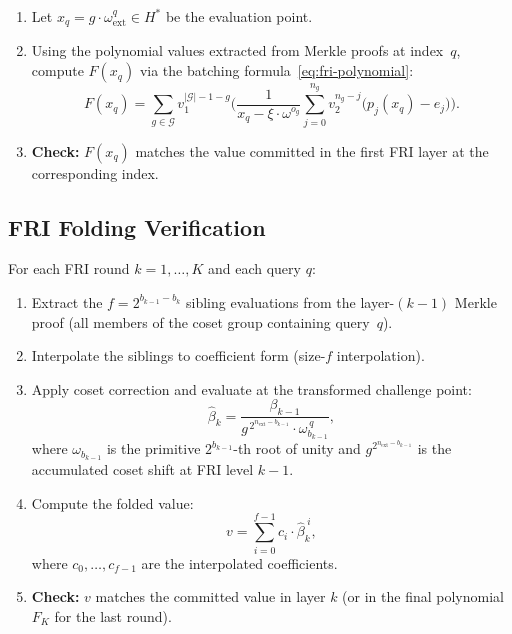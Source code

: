\begin{enumerate}[label=(\roman*)]
  \item Let $x_q = g \cdot \omega_{\mathrm{ext}}^q \in H^*$ be the evaluation point.

  \item Using the polynomial values extracted from Merkle proofs at index~$q$,
        compute $F(x_q)$ via the batching formula~\eqref{eq:fri-polynomial}:
        \[
          F(x_q) = \sum_{g \in \mathcal{G}} v_1^{|\mathcal{G}|-1-g}
                   \Biggl(
                     \frac{1}{x_q - \xi \cdot \omega^{o_g}}
                     \sum_{j=0}^{n_g} v_2^{n_g - j}
                     \bigl(p_j(x_q) - e_j\bigr)
                   \Biggr).
        \]

  \item \textbf{Check:} $F(x_q)$ matches the value committed in the first FRI layer
        at the corresponding index.
\end{enumerate}

\subsection{FRI Folding Verification}
\label{sec:fri-fold-verify}

For each FRI round $k = 1, \ldots, K$ and each query $q$:

\begin{enumerate}[label=(\roman*)]
  \item Extract the $f = 2^{b_{k-1} - b_k}$ sibling evaluations from the
        layer-$(k-1)$ Merkle proof (all members of the coset group
        containing query~$q$).

  \item Interpolate the siblings to coefficient form
        (size-$f$ interpolation).

  \item Apply coset correction and evaluate at the transformed challenge point:
        \[
          \hat{\beta}_k = \frac{\beta_{k-1}}{g^{\,2^{n_{\mathrm{ext}} - b_{k-1}}} \cdot \omega_{b_{k-1}}^{\,q}},
        \]
        where $\omega_{b_{k-1}}$ is the primitive $2^{b_{k-1}}$-th root of unity
        and $g^{2^{n_{\mathrm{ext}} - b_{k-1}}}$ is the accumulated coset shift
        at FRI level $k-1$.

  \item Compute the folded value:
        \[
          v = \sum_{i=0}^{f-1} c_i \cdot \hat{\beta}_k^{\;i},
        \]
        where $c_0, \ldots, c_{f-1}$ are the interpolated coefficients.

  \item \textbf{Check:}
        $v$ matches the committed value in layer $k$
        (or in the final polynomial $F_K$ for the last round).
\end{enumerate}

